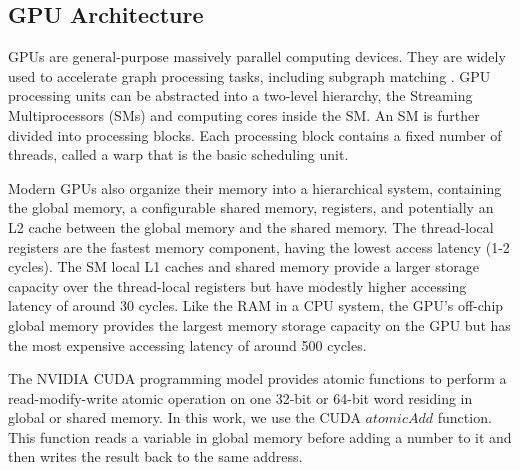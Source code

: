 \subsection{GPU Architecture}
GPUs are general-purpose massively parallel computing devices. They are widely used to accelerate graph processing tasks, including
subgraph matching \FIXME{\cite{}}. GPU processing units can be abstracted into a two-level hierarchy, the Streaming Multiprocessors (SMs)
and computing cores inside the SM. An SM is further divided into processing blocks. Each processing block contains a fixed number of
threads, called a warp that is the basic scheduling unit.

Modern GPUs also organize their memory into a hierarchical system, containing the global memory, a configurable shared memory, registers,
and potentially an L2 cache between the global memory and the shared memory. The thread-local registers are the fastest memory component,
having the lowest access latency (1-2 cycles). The SM local L1 caches and shared memory provide a larger storage capacity over the
thread-local registers but have modestly higher accessing latency of around 30 cycles. Like the RAM in a CPU system, the GPU’s off-chip
global memory provides the largest memory storage capacity on the GPU but has the most expensive accessing latency of around 500 cycles.

The NVIDIA CUDA programming model provides atomic functions to perform a read-modify-write atomic operation on one 32-bit or 64-bit word
residing in global or shared memory. In this work, we use the CUDA $atomicAdd$ function. This function reads a variable in global memory
before adding a number to it and then writes the result back to the same address.



%
